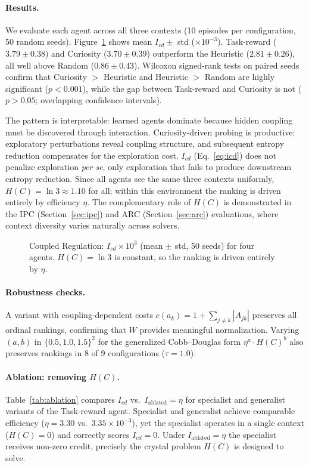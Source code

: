 \documentclass[runningheads,a4paper]{llncs}
\begin{document}
\paragraph{Results.} We evaluate each agent across all three contexts (10 episodes per configuration, 50 random seeds). Figure~\ref{fig:coupled-regulation} shows mean $I_{cd} \pm$ std ($\times 10^{-3}$). Task-reward ($3.79 \pm 0.38$) and Curiosity ($3.70 \pm 0.39$) outperform the Heuristic ($2.81 \pm 0.26$), all well above Random ($0.86 \pm 0.43$). Wilcoxon signed-rank tests on paired seeds confirm that Curiosity $>$ Heuristic and Heuristic $>$ Random are highly significant ($p < 0.001$), while the gap between Task-reward and Curiosity is not ($p > 0.05$; overlapping confidence intervals).

The pattern is interpretable: learned agents dominate because hidden coupling must be discovered through interaction. Curiosity-driven probing is productive: exploratory perturbations reveal coupling structure, and subsequent entropy reduction compensates for the exploration cost. $I_{cd}$ (Eq.~\ref{eq:icd}) does not penalize exploration \emph{per se}, only exploration that fails to produce downstream entropy reduction. Since all agents see the same three contexts uniformly, $H(C) = \ln 3 \approx 1.10$ for all; within this environment the ranking is driven entirely by efficiency $\eta$. The complementary role of $H(C)$ is demonstrated in the IPC (Section~\ref{sec:ipc}) and ARC (Section~\ref{sec:arc}) evaluations, where context diversity varies naturally across solvers.

\begin{figure}[t]
\centering

\caption{Coupled Regulation: $I_{cd} \times 10^3$ (mean $\pm$ std, 50 seeds) for four agents. $H(C) = \ln 3$ is constant, so the ranking is driven entirely by $\eta$.}
\label{fig:coupled-regulation}
\end{figure}

\paragraph{Robustness checks.} A variant with coupling-dependent costs $c(a_k) = 1 + \sum_{j \neq k} |A_{jk}|$ preserves all ordinal rankings, confirming that $W$ provides meaningful normalization. Varying $(a,b)$ in $\{0.5, 1.0, 1.5\}^2$ for the generalized Cobb--Douglas form $\eta^a \cdot H(C)^b$ also preserves rankings in 8 of 9 configurations ($\tau = 1.0$).

\paragraph{Ablation: removing $H(C)$.} Table~\ref{tab:ablation} compares $I_{cd}$ vs.\ $I_{\text{ablated}} = \eta$ for specialist and generalist variants of the Task-reward agent. Specialist and generalist achieve comparable efficiency ($\eta = 3.30$ vs.\ $3.35 \times 10^{-3}$), yet the specialist operates in a single context ($H(C) = 0$) and correctly scores $I_{cd} = 0$. Under $I_{\text{ablated}} = \eta$ the specialist receives non-zero credit, precisely the crystal problem $H(C)$ is designed to solve.
\end{document}
